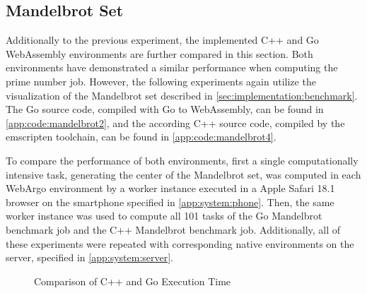 \subsection{Mandelbrot Set}
Additionally to the previous experiment, the implemented C++ and Go WebAssembly environments are further compared in this section. Both environments have demonstrated a similar performance when computing the prime number job. However, the following experiments again utilize the visualization of the Mandelbrot set described in \autoref{sec:implementation:benchmark}. The Go source code, compiled with Go \cite{methodology:go} to WebAssembly, can be found in \autoref{app:code:mandelbrot2}, and the according C++ source code, compiled by the emscripten \cite{methodology:emcc} toolchain, can be found in \autoref{app:code:mandelbrot4}.

To compare the performance of both environments, first a single computationally intensive task, generating the center of the Mandelbrot set, was computed in each WebArgo environment by a worker instance executed in a Apple Safari 18.1 \cite{evaluation:safari} browser on the smartphone specified in \autoref{app:system:phone}. Then, the same worker instance was used to compute all 101 tasks of the Go Mandelbrot benchmark job and the C++ Mandelbrot benchmark job. Additionally, all of these experiments were repeated with corresponding native environments on the server, specified in \autoref{app:system:server}.
\begin{figure}[htbp]
    \myfloatalign
    \caption{Comparison of C++ and Go Execution Time}
    \label{fig:evaluation:experiment-E}
\end{figure}
